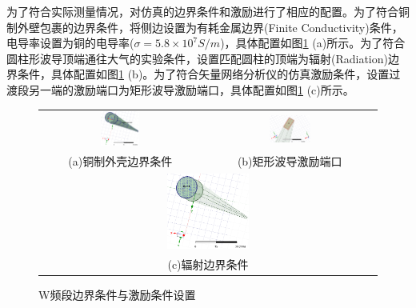 \documentclass[master]{thesis-uestc}
\begin{document}
为了符合实际测量情况，对仿真的边界条件和激励进行了相应的配置。为了符合铜制外壁包裹的边界条件，将侧边设置为有耗金属边界(Finite Conductivity)条件，电导率设置为铜的电导率(\(\sigma = 5.8 \times 10 ^ 7 S/m \))，具体配置如图\ref{fig:W频段边界条件与激励条件设置} (a)所示。为了符合圆柱形波导顶端通往大气的实验条件，设置匹配圆柱的顶端为辐射(Radiation)边界条件，具体配置如图\ref{fig:W频段边界条件与激励条件设置} (b)。为了符合矢量网络分析仪的仿真激励条件，设置过渡段另一端的激励端口为矩形波导激励端口，具体配置如图\ref{fig:W频段边界条件与激励条件设置} (c)所示。
\begin{figure}[!htbp]
    \small
    \centering
    \begin{tabular}{@{\ }c@{\ }c}
        \includegraphics[width=0.25\textwidth]{pic/chapter5/铜制边界条件.png} & 
        \hspace{5pt}
        \includegraphics[width=0.25\textwidth]{pic/chapter5/矩形波导激励端口.png}     \\
        \mbox{\small (a)铜制外壳边界条件}                                                                               & 
        \mbox{\small (b)矩形波导激励端口}                                                                                  \\[6bp]
        \multicolumn{2}{c}{\includegraphics[width=0.25\textwidth]{pic/chapter5/辐射边界条件.png}} \\  %
        \multicolumn{2}{c}{\mbox{\small (c)辐射边界条件}}
    \end{tabular}
    \caption{W频段边界条件与激励条件设置}
    \label{fig:W频段边界条件与激励条件设置}
\end{figure}
\end{document}
